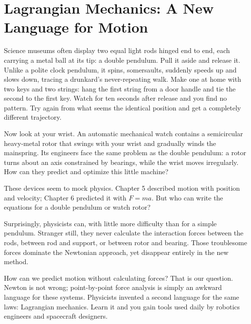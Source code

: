 \chapter{Lagrangian Mechanics: A New Language for Motion}


\begin{mainline}
Science museums often display two equal light rods hinged end to end, each carrying a metal ball at its tip: a double pendulum. Pull it aside and release it. Unlike a polite clock pendulum, it spins, somersaults, suddenly speeds up and slows down, tracing a drunkard's never-repeating walk. Make one at home with two keys and two strings: hang the first string from a door handle and tie the second to the first key. Watch for ten seconds after release and you find no pattern. Try again from what seems the identical position and get a completely different trajectory.

Now look at your wrist. An automatic mechanical watch contains a semicircular heavy-metal rotor that swings with your wrist and gradually winds the mainspring. Its engineers face the same problem as the double pendulum: a rotor turns about an axis constrained by bearings, while the wrist moves irregularly. How can they predict and optimize this little machine?

These devices seem to mock physics. Chapter 5 described motion with position and velocity; Chapter 6 predicted it with \(F=ma\). But who can write the equations for a double pendulum or watch rotor?

Surprisingly, physicists can, with little more difficulty than for a simple pendulum. Stranger still, they never calculate the interaction forces between the rods, between rod and support, or between rotor and bearing. Those troublesome forces dominate the Newtonian approach, yet disappear entirely in the new method.

How can we predict motion without calculating forces? That is our question. Newton is not wrong; point-by-point force analysis is simply an awkward language for these systems. Physicists invented a second language for the same laws: Lagrangian mechanics. Learn it and you gain tools used daily by robotics engineers and spacecraft designers.
\end{mainline}


